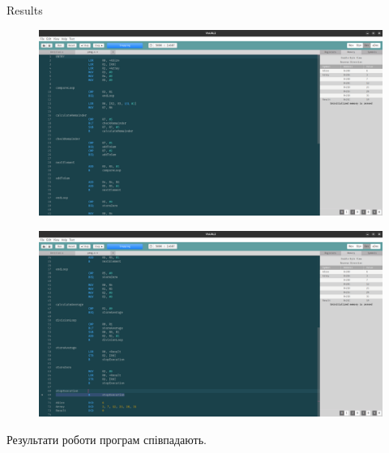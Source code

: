 \documentclass[a4paper,12pt]{article}
\begin{document}
\newpage
    \begin{center}
        \Large{Results}
    \end{center}
    \begin{figure}[h!]
        \begin{minipage}[h]{1\linewidth}
            \centering
            \includegraphics[width=1\linewidth]{Prt sc/1_1.png}  
        \end{minipage}
    \end{figure}
    \begin{figure}[h!]
        \begin{minipage}[h]{1\linewidth}
            \centering
            \includegraphics[width=1\linewidth]{Prt sc/1_2.png}  
        \end{minipage}
    \end{figure}
    Результати роботи програм співпадають.
\end{document}
